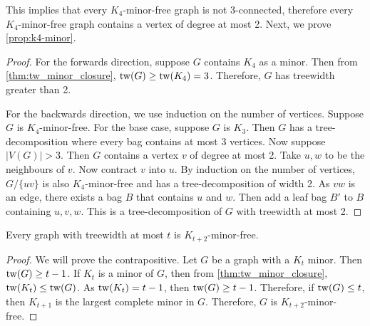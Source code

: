This implies that every $K_4$-minor-free graph is not $3$-connected, therefore every $K_4$-minor-free graph contains a vertex of degree at most 2. Next, we prove \cref{prop:k4-minor}.

\begin{proof}
	For the forwards direction, suppose $G$ contains $K_4$ as a minor. Then from \cref{thm:tw_minor_closure}, $\operatorname{tw}(G) \geq \operatorname{tw}(K_4) = 3$. Therefore, $G$ has treewidth greater than 2. 

	For the backwards direction, we use induction on the number of vertices. Suppose $G$ is $K_4$-minor-free. For the base case, suppose $G$ is $K_3$. Then $G$ has a tree-decomposition where every bag contains at most $3$ vertices. Now suppose $|V(G)| > 3$. Then $G$ contains a vertex $v$ of degree at most 2. Take $u, w$ to be the neighbours of $v$. Now contract $v$ into $u$. By induction on the number of vertices, $G / \{uv\}$ is also $K_4$-minor-free and has a tree-decomposition of width 2. As $vw$ is an edge, there exists a bag $B$ that contains $u$ and $w$. Then add a leaf bag $B'$ to $B$ containing $u, v, w$. This is a tree-decomposition of $G$ with treewidth at most 2.
\end{proof}




\begin{proposition}\label{thm:treewidth_clique-minor-free}
	Every graph with treewidth at most $t$ is $K_{t+2}$-minor-free. 
\end{proposition}
\begin{proof}
	We will prove the contrapositive. Let $G$ be a graph with a $K_t$ minor. Then \(\operatorname{tw}(G) \geq t-1\).
	If \(K_t\) is a minor of \(G\), then from \cref{thm:tw_minor_closure}, \(\operatorname{tw}(K_t) \leq \operatorname{tw}(G)\). As \(\operatorname{tw}(K_t) = t-1\), then \(\operatorname{tw}(G) \geq t - 1\). Therefore, if $\operatorname{tw}(G) \leq t$, then $K_{t+1}$ is the largest complete minor in $G$. Therefore, $G$ is $K_{t + 2}$-minor-free. 
\end{proof}

